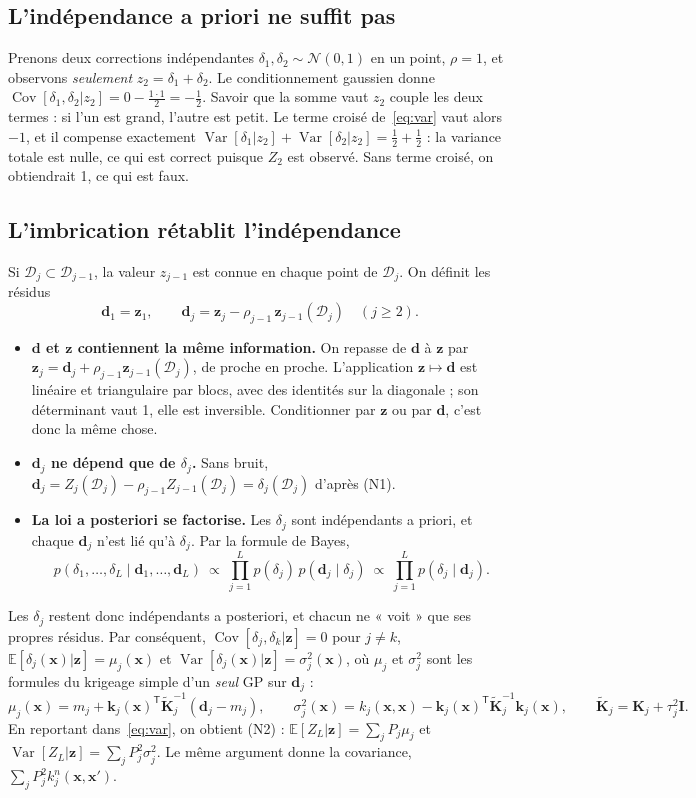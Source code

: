 \documentclass[10pt,a4paper]{article}
\newcommand{\vx}{\bm{x}}
\newcommand{\vz}{\bm{z}}
\newcommand{\vd}{\bm{d}}
\newcommand{\Kt}{\widetilde{\bm{K}}}
\newcommand{\D}{\mathcal{D}}
\newcommand{\tp}{^{\mathsf{T}}}
\DeclareMathOperator{\Var}{Var}
\DeclareMathOperator{\Cov}{Cov}
\begin{document}
\subsection{L'indépendance a priori ne suffit pas}
Prenons deux corrections indépendantes $\delta_1,\delta_2\sim\mathcal{N}(0,1)$ en un point, $\rho=1$, et
observons \emph{seulement} $z_2=\delta_1+\delta_2$. Le conditionnement gaussien donne
$\Cov[\delta_1,\delta_2|z_2]=0-\frac{1\cdot1}{2}=-\tfrac12$. Savoir que la somme vaut $z_2$ couple les deux
termes : si l'un est grand, l'autre est petit. Le terme croisé de~\eqref{eq:var} vaut alors $-1$, et il
compense exactement $\Var[\delta_1|z_2]+\Var[\delta_2|z_2]=\tfrac12+\tfrac12$ : la variance totale est
nulle, ce qui est correct puisque $Z_2$ est observé. Sans terme croisé, on obtiendrait 1, ce qui est faux.

\subsection{L'imbrication rétablit l'indépendance}
Si $\D_j\subset\D_{j-1}$, la valeur $z_{j-1}$ est connue en chaque point de $\D_j$. On définit les résidus
\[
  \vd_1=\vz_1,\qquad \vd_j=\vz_j-\rho_{j-1}\,\vz_{j-1}(\D_j)\quad(j\ge2).
\]
\begin{itemize}
  \item \textbf{$\vd$ et $\vz$ contiennent la même information.} On repasse de $\vd$ à $\vz$ par
        $\vz_j=\vd_j+\rho_{j-1}\vz_{j-1}(\D_j)$, de proche en proche. L'application $\vz\mapsto\vd$ est linéaire
        et triangulaire par blocs, avec des identités sur la diagonale ; son déterminant vaut 1, elle est
        inversible. Conditionner par $\vz$ ou par $\vd$, c'est donc la même chose.
  \item \textbf{$\vd_j$ ne dépend que de $\delta_j$.} Sans bruit,
        $\vd_j=Z_j(\D_j)-\rho_{j-1}Z_{j-1}(\D_j)=\delta_j(\D_j)$ d'après (N1).
  \item \textbf{La loi a posteriori se factorise.} Les $\delta_j$ sont indépendants a priori, et chaque
        $\vd_j$ n'est lié qu'à $\delta_j$. Par la formule de Bayes,
        \[
          p(\delta_1,\dots,\delta_L\mid\vd_1,\dots,\vd_L)\ \propto\ \prod_{j=1}^{L}p(\delta_j)\,p(\vd_j\mid\delta_j)
          \ \propto\ \prod_{j=1}^{L}p(\delta_j\mid\vd_j).
        \]
\end{itemize}
Les $\delta_j$ restent donc indépendants a posteriori, et chacun ne « voit » que ses propres résidus. Par
conséquent, $\Cov[\delta_j,\delta_k|\vz]=0$ pour $j\ne k$, $\mathbb{E}[\delta_j(\vx)|\vz]=\mu_j(\vx)$ et
$\Var[\delta_j(\vx)|\vz]=\sigma_j^2(\vx)$, où $\mu_j$ et $\sigma_j^2$ sont les formules du krigeage simple
d'un \emph{seul} GP sur $\vd_j$ :
\[
  \mu_j(\vx)=m_j+\mathbf{k}_j(\vx)\tp\Kt_j^{-1}(\vd_j-m_j),\qquad
  \sigma_j^2(\vx)=k_j(\vx,\vx)-\mathbf{k}_j(\vx)\tp\Kt_j^{-1}\mathbf{k}_j(\vx),\qquad
  \Kt_j=\mathbf{K}_j+\tau_j^2\mathbf{I}.
\]
En reportant dans~\eqref{eq:var}, on obtient (N2) :
$\mathbb{E}[Z_L|\vz]=\sum_jP_j\mu_j$ et $\Var[Z_L|\vz]=\sum_jP_j^2\sigma_j^2$. Le même argument donne la
covariance, $\sum_jP_j^2k^n_j(\vx,\vx')$.
\end{document}
